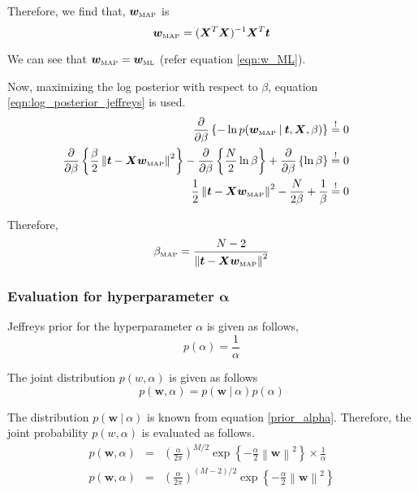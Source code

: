 \documentclass[11pt]{article}
\newcommand{\mle}[1]{{#1}_{\text{\tiny ML}}}
\newcommand{\map}[1]{{#1}_{\text{\tiny MAP}}}
\newcommand\given[1][]{\:#1\vert\:}
\newcommand{\norm}[1]{\left\lVert#1\right\rVert}
\begin{document}
Therefore, we find that, $\map{\bm{w}}$ is
\begin{equation}
    \map{\bm{w}} = (\bm{X}^T \bm{X})^{-1} \bm{X}^T \bm{t}
\end{equation}

We can see that $\map{\bm{w}} = \mle{\bm w}$ (refer equation \ref{eqn:w_ML}). 

Now, maximizing the log posterior with respect to $\beta$, equation \ref{eqn:log_posterior_jeffreys} is used.
\begin{eqnarray}
    \frac{\partial }{\partial  \beta} \left\{ -\ln{p(\map{\bm{w}} \given \bm{t}, \bm{X}, \beta)} \right\} 
    &\overset{!}{=} 0& \\
    \frac{\partial }{\partial \beta} \left\{\frac{\beta}{2} \norm{\bm{t} - \bm{X}\map{\bm{w}}}^2 \right\}
    - \frac{\partial }{\partial \beta} \left\{\frac{N}{2}\ln{\beta} \right\} + \frac{\partial }{\partial \beta} \left\{ \ln{\beta} \right\}
    &\overset{!}{=} 0& \\
    \frac{1}{2} \norm{\bm{t} - \bm{X}\map{\bm{w}}}^2 - \frac{N}{2\beta} + \frac{1}{\beta}
    &\overset{!}{=} 0&
\end{eqnarray}

Therefore, 
\begin{equation} \label{beta_map}
    \map{\beta} = \frac{N-2}{\norm{\bm{t} - \bm{X}\map{\bm{w}}}^2}
\end{equation}

\subsubsection{Evaluation for hyperparameter $\bm{\alpha}$}

Jeffreys prior for the hyperparameter $\alpha$ is given as follows,
\begin{equation}
    p(\alpha) = \frac{1}{\alpha}
\end{equation}

The joint distribution $p(w,\alpha)$ is given as follows
\begin{equation} \label{eqn:joint_alpha}
    p(\bm{w}, \alpha) = p(\bm{w} \given \alpha)p(\alpha)
\end{equation}

The distribution $p(\bm{w} \given \alpha)$ is known from equation \ref{prior_alpha}. Therefore, the joint probability $p(w, \alpha)$ is evaluated as follows.
\begin{eqnarray}
    p(\bm{w}, \alpha) 
    &=&
    \left( \frac{\alpha}{2\pi}\right)^{M/2} \exp{\left\{ -\frac{\alpha}{2}\norm{\bm{w}}^2\right\}} \times \frac{1}{\alpha} \\
    p(\bm{w}, \alpha) 
    &=& 
    \left( \frac{\alpha}{2\pi}\right)^{\left( M-2\right)/2} \exp{\left\{ -\frac{\alpha}{2}\norm{\bm{w}}^2\right\}}
\end{eqnarray}
\end{document}
